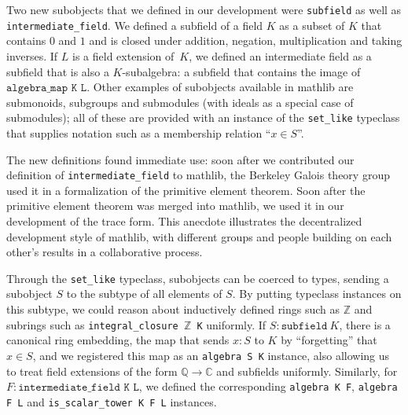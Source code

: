 \documentclass[sn-mathphys]{sn-jnl}%
\renewcommand{\C}{\mathbb{C}}
\newcommand{\lean}[1]{\texttt{#1}\xspace}
\newcommand{\mathlib}{\textsf{mathlib}\xspace}
\newcommand{\QQ}{\mathbb{Q}}
\renewcommand{\Z}{\mathbb{Z}}
\begin{document}
Two new subobjects that we defined in our development were \lean{subfield} as well as \lean{intermediate\_field}. We defined a subfield of a field $K$ as a subset of $K$ that contains $0$ and $1$ and is closed under addition, negation, multiplication and taking inverses.
If $L$ is a field extension of~$K$, we defined an intermediate field as a subfield that is also a $K$-subalgebra: a subfield that contains the image of $\lean{algebra\_map K L}$.
Other examples of subobjects available in \mathlib are submonoids, subgroups and submodules (with ideals as a special case of submodules);
all of these are provided with an instance of the \lean{set\_like} typeclass that supplies notation such as a membership relation ``$x \in S$''.

The new definitions found immediate use:
soon after we contributed our definition of \lean{intermediate\_field} to \mathlib,
the Berkeley Galois theory group used it in a formalization of the primitive element theorem.
Soon after the primitive element theorem was merged into \mathlib,
we used it in our development of the trace form.
This anecdote illustrates the decentralized development style of \mathlib,
with different groups and people building on each other's results in a collaborative process.

Through the \lean{set\_like} typeclass, subobjects can be coerced to types, sending a subobject $S$ to the subtype of all elements of $S$.
By putting typeclass instances on this subtype,
we could reason about inductively defined rings such as $\Z$ and subrings such as \lean{integral\_closure $\Z$ K} uniformly.
If $S : \lean{subfield}\ K$, there is a canonical ring embedding, the map that sends $x : S$ to $K$ by ``forgetting'' that $x \in S$,
and we registered this map as an \lean{algebra S K} instance, also allowing us to treat field extensions of the form $\QQ \to \C$ and subfields uniformly.
Similarly, for $F : \lean{intermediate\_field K L}$, we defined the corresponding \lean{algebra K F}, \lean{algebra F L} and \lean{is\_scalar\_tower K F L} instances.
\end{document}
